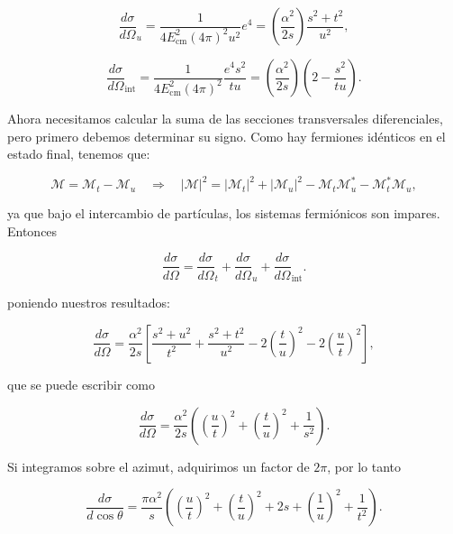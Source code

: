 \begin{equation}
\frac{d\sigma}{d\Omega}_u = \frac{1}{4E_{\text{cm}}^2 (4\pi)^2 u^2} e^4 = \left( \frac{\alpha^2}{2s} \right) \frac{s^2 + t^2}{u^2},
\end{equation}

\begin{equation}
\frac{d\sigma}{d\Omega}_{\text{int}} = \frac{1}{4E_{\text{cm}}^2 (4\pi)^2} \frac{e^4 s^2}{tu} = \left( \frac{\alpha^2}{2s} \right) \left( 2 - \frac{s^2}{tu} \right).
\end{equation}

Ahora necesitamos calcular la suma de las secciones transversales diferenciales, pero primero debemos determinar su signo. Como hay fermiones idénticos en el estado final, tenemos que:

\begin{equation}
\mathcal{M} = \mathcal{M}_t - \mathcal{M}_u \quad \Rightarrow \quad |\mathcal{M}|^2 = |\mathcal{M}_t|^2 + |\mathcal{M}_u|^2 - \mathcal{M}_t \mathcal{M}_u^* - \mathcal{M}_t^* \mathcal{M}_u,
\end{equation}

ya que bajo el intercambio de partículas, los sistemas fermiónicos son impares. Entonces

\begin{equation}
\frac{d\sigma}{d\Omega} = \frac{d\sigma}{d\Omega}_t + \frac{d\sigma}{d\Omega}_u + \frac{d\sigma}{d\Omega}_{\text{int}}.
\end{equation}

poniendo nuestros resultados:

\begin{equation}
\frac{d\sigma}{d\Omega} = \frac{\alpha^2}{2s} \left[ \frac{s^2 + u^2}{t^2} + \frac{s^2 + t^2}{u^2} - 2 \left( \frac{t}{u} \right)^2 - 2 \left( \frac{u}{t} \right)^2 \right],
\end{equation}

que se puede escribir como

\begin{equation}
\frac{d\sigma}{d\Omega} = \frac{\alpha^2}{2s} \left( \left( \frac{u}{t} \right)^2 + \left( \frac{t}{u} \right)^2 + \frac{1}{s^2} \right) .
\end{equation}

Si integramos sobre el azimut, adquirimos un factor de $2\pi$, por lo tanto

\begin{equation}
\frac{d\sigma}{d\cos\theta} = \frac{\pi \alpha^2}{s} \left( \left( \frac{u}{t} \right)^2 + \left( \frac{t}{u} \right)^2 + 2 s + \left( \frac{1}{u} \right)^2 + \frac{1}{t^2} \right).
\end{equation}

